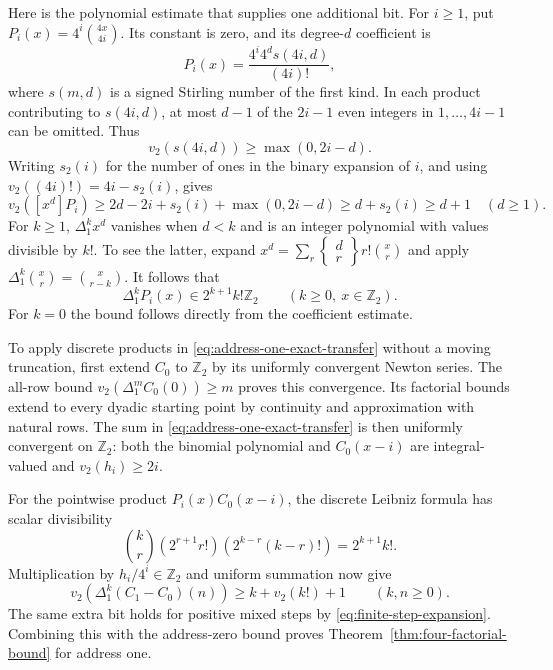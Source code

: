 Here is the polynomial estimate that supplies one additional bit.
For $i\geq1$, put $P_i(x)=4^i\binom{4x}{4i}$. Its constant is zero,
and its degree-$d$ coefficient is
\begin{equation}
 [x^d]P_i(x)=\frac{4^i4^d s(4i,d)}{(4i)!},
 \label{eq:scaled-binomial-coefficients}
\end{equation}
where $s(m,d)$ is a signed Stirling number of the first kind.
In each product contributing to $s(4i,d)$, at most $d-1$ of the
$2i-1$ even integers in $1,\ldots,4i-1$ can be omitted. Thus
\[
 v_2(s(4i,d))\geq\max(0,2i-d).
\]
Writing $s_2(i)$ for the number of ones in the binary expansion of $i$,
and using $v_2((4i)!)=4i-s_2(i)$, gives
\begin{equation}
 v_2([x^d]P_i)
 \geq2d-2i+s_2(i)+\max(0,2i-d)
 \geq d+s_2(i)\geq d+1\quad(d\geq1).
 \label{eq:scaled-binomial-degree-bound}
\end{equation}
For $k\geq1$, $\Delta_1^k x^d$ vanishes when $d<k$ and is an
integer polynomial with values divisible by $k!$. To see the latter,
expand $x^d=\sum_r\left\{\begin{smallmatrix}d\\r\end{smallmatrix}\right\}
r!\binom xr$ and apply
$\Delta_1^k\binom xr=\binom{x}{r-k}$.
It follows that
\begin{equation}
 \Delta_1^kP_i(x)\in2^{k+1}k!\mathbb Z_2
                      \qquad(k\geq0,\ x\in\mathbb Z_2).
 \label{eq:scaled-binomial-difference-bound}
\end{equation}
For $k=0$ the bound follows directly from the coefficient estimate.

To apply discrete products in \eqref{eq:address-one-exact-transfer}
without a moving truncation, first extend $C_0$ to $\mathbb Z_2$ by its
uniformly convergent Newton series. The all-row bound
$v_2(\Delta_1^m C_0(0))\geq m$ proves this convergence. Its factorial
bounds extend to every dyadic starting point by continuity and
approximation with natural rows. The sum in
\eqref{eq:address-one-exact-transfer} is then uniformly convergent on
$\mathbb Z_2$: both the binomial polynomial and $C_0(x-i)$ are
integral-valued and $v_2(h_i)\geq2i$.

For the pointwise product $P_i(x)C_0(x-i)$, the discrete Leibniz formula
has scalar divisibility
\[
 \binom kr(2^{r+1}r!)(2^{k-r}(k-r)!)=2^{k+1}k!.
\]
Multiplication by $h_i/4^i\in\mathbb Z_2$ and uniform summation now give
\begin{equation}
 v_2(\Delta_1^k(C_1-C_0)(n))
               \geq k+v_2(k!)+1\qquad(k,n\geq0).
 \label{eq:address-one-extra-bit}
\end{equation}
The same extra bit holds for positive mixed steps by
\eqref{eq:finite-step-expansion}. Combining this with the address-zero
bound proves Theorem~\ref{thm:four-factorial-bound} for address one.

